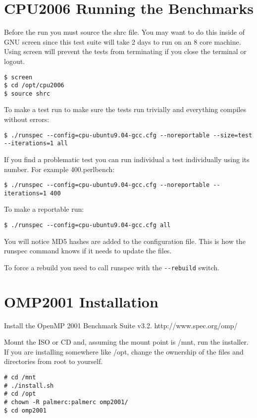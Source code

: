 \documentclass[12pt,twoside,a4paper]{article}
\begin{document}
\section{CPU2006 Running the Benchmarks}
Before the run you must source the shrc file. You may want to do this inside of GNU screen since this test suite will
take 2 days to run on an 8 core machine. Using screen will prevent the tests from terminating if you close the terminal or logout.
\begin{lstlisting}
$ screen
$ cd /opt/cpu2006
$ source shrc
\end{lstlisting}

To make a test run to make sure the tests run trivially and everything compiles without errors:
\begin{lstlisting}
$ ./runspec --config=cpu-ubuntu9.04-gcc.cfg --noreportable --size=test --iterations=1 all
\end{lstlisting}

If you find a problematic test you can run individual a test individually using its number. For example 400.perlbench:
\begin{lstlisting}
$ ./runspec --config=cpu-ubuntu9.04-gcc.cfg --noreportable --iterations=1 400
\end{lstlisting}

To make a reportable run:
\begin{lstlisting}
$ ./runspec --config=cpu-ubuntu9.04-gcc.cfg all
\end{lstlisting}

You will notice MD5 hashes are added to the configuration file. This is how the runspec command knows if it needs to update the files.

To force a rebuild you need to call runspec with the \verb,--rebuild, switch.

\section{OMP2001 Installation}
Install the OpenMP 2001 Benchmark Suite v3.2. http://www.spec.org/omp/

Mount the ISO or CD and, assuming the mount point is /mnt, run the installer. If you are installing somewhere like /opt, change the ownership of the files and directories from root to yourself.

\begin{lstlisting}
# cd /mnt
# ./install.sh
# cd /opt
# chown -R palmerc:palmerc omp2001/
$ cd omp2001
\end{lstlisting}
\end{document}
